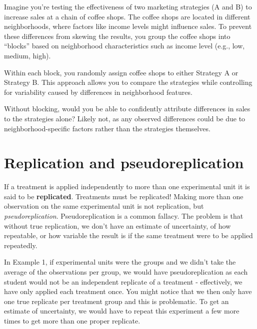 \documentclass[
  letterpaper,
]{book}
\begin{document}
\begin{tcolorbox}[enhanced jigsaw, opacitybacktitle=0.6, colbacktitle=quarto-callout-warning-color!10!white, toprule=.15mm, bottomtitle=1mm, breakable, leftrule=.75mm, rightrule=.15mm, left=2mm, colback=white, coltitle=black, toptitle=1mm, colframe=quarto-callout-warning-color-frame, bottomrule=.15mm, title={Example 2}, arc=.35mm, titlerule=0mm, opacityback=0]

Imagine you're testing the effectiveness of two marketing strategies (A
and B) to increase sales at a chain of coffee shops. The coffee shops
are located in different neighborhoods, where factors like income levels
might influence sales. To prevent these differences from skewing the
results, you group the coffee shops into ``blocks'' based on
neighborhood characteristics such as income level (e.g., low, medium,
high).

Within each block, you randomly assign coffee shops to either Strategy A
or Strategy B. This approach allows you to compare the strategies while
controlling for variability caused by differences in neighborhood
features.

Without blocking, would you be able to confidently attribute differences
in sales to the strategies alone? Likely not, as any observed
differences could be due to neighborhood-specific factors rather than
the strategies themselves.

\end{tcolorbox}

\section*{\texorpdfstring{\textbf{Replication and
pseudoreplication}}{Replication and pseudoreplication}}\label{replication-and-pseudoreplication}


If a treatment is applied independently to more than one experimental
unit it is said to be \textbf{replicated}. Treatments must be
replicated! Making more than one observation on the same experimental
unit is not replication, but \emph{pseudoreplication}. Pseudoreplication
is a common fallacy. The problem is that without true replication, we
don't have an estimate of uncertainty, of how repeatable, or how
variable the result is if the same treatment were to be applied
repeatedly.

In Example 1, if experimental units were the groups and we didn't take
the average of the observations per group, we would have
pseudoreplication as each student would not be an independent replicate
of a treatment - effectively, we have only applied each treatment once.
You might notice that we then only have one true replicate per treatment
group and this is problematic. To get an estimate of uncertainty, we
would have to repeat this experiment a few more times to get more than
one proper replicate.
\end{document}
